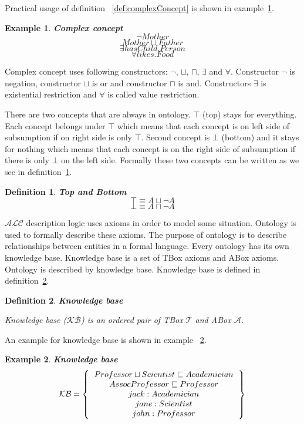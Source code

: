 \documentclass[12pt,a4paper]{article}
\newtheorem{definition}{Definition}[subsection]
\newtheorem{example}{Example}[subsection]
\begin{document}
Practical usage of definition ~\ref{def:complexConcept} is shown in example~\ref{example:complexConcept}.

\begin{example}{\textbf{Complex concept}}
	\label{example:complexConcept}
\[ \neg Mother \]
\[ Mother \sqcup Father \]
\[ \exists hasChild.Person \]
\[ \forall likes.Food \]
\end{example}

Complex concept uses following constructors: $\neg$, $\sqcup$, $\sqcap$, $\exists$ and $\forall$. Constructor $\neg$ is negation, constructor $\sqcup$ is or and constructor $\sqcap$ is and. Constructors $\exists$ is existential restriction and $\forall$ is called value restriction.

There are two concepts that are always in ontology. $\top$ (top) stays for everything. Each concept belongs under $\top$ which means that each concept is on left side of subsumption if on right side is only $\top$. Second concept is $\bot$ (bottom) and it stays for nothing which means that each concept is on the right side of subsumption if there is only $\bot$ on the left side. Formally these two concepts can be written as we see in definition~\ref{def:topBottom}.

\begin{definition}{\textbf{Top and Bottom}}
	\label{def:topBottom}
	\[ \top \equiv A \sqcup \neg A \] 
	\[ \bot \equiv A \sqcap \neg A \]
\end{definition}

$\mathcal{ALC}$ description logic uses axioms in order to model some situation. Ontology \citep{staabHandbookOntology} is used to formally describe these axioms. The purpose of ontology is to describe relationships between entities in a formal language. Every ontology has its own knowledge base. Knowledge base is a set of TBox axioms and ABox axioms. Ontology is described by knowledge base. Knowledge base is defined in definition~\ref{def:knowledgeBase}.

\begin{definition}{\textbf{Knowledge base}}
	\label{def:knowledgeBase}
	
	Knowledge base ($\mathcal{KB}$) is an ordered pair of \textit{TBox} $\mathcal{T}$ and \textit{ABox} $\mathcal{A}$.
\end{definition}

An example for knowledge base is shown in example ~\ref{example:knowledgeBase}.

\begin{example}{\textbf{Knowledge base}}
	\label{example:knowledgeBase}
	\[ 
	\mathcal{KB} = \left\{
	\begin{tabular}{c c}
	$Professor \sqcup Scientist \sqsubseteq Academician$ \\
	$AssocProfessor \sqsubseteq Professor$ \\
	$jack : Academician$ \\
	$jane : Scientist$ \\
	$john : Professor$ \\	
	\end{tabular}
	\right \}
	\]
\end{example}
\end{document}
